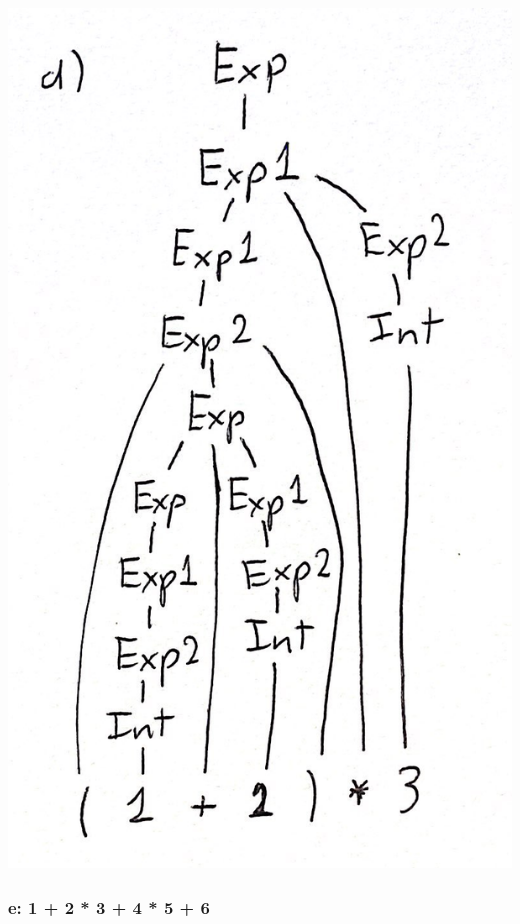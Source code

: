 \documentclass{article}
\theoremstyle{theorem}
\theoremstyle{definition}
\theoremstyle{remark}
\begin{document}
\begin{center}
  \includegraphics*[scale=0.1]{treeD.jpg}
  \end{center}

\subsubsection*{e: 1 + 2 * 3 + 4 * 5 + 6}
\end{document}
